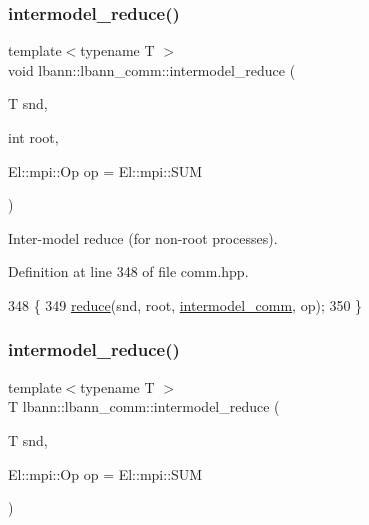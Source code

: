 \subsubsection{\texorpdfstring{intermodel\+\_\+reduce()}{intermodel\_reduce()}\hspace{0.1cm}{\footnotesize\ttfamily [1/2]}}
{\footnotesize\ttfamily template$<$typename T $>$ \\
void lbann\+::lbann\+\_\+comm\+::intermodel\+\_\+reduce (\begin{DoxyParamCaption}\item[{T}]{snd,  }\item[{int}]{root,  }\item[{El\+::mpi\+::\+Op}]{op = {\ttfamily El\+:\+:mpi\+:\+:SUM} }\end{DoxyParamCaption})\hspace{0.3cm}{\ttfamily [inline]}}

Inter-\/model reduce (for non-\/root processes). 

Definition at line 348 of file comm.\+hpp.


\begin{DoxyCode}
348                                                                  \{
349     \hyperlink{classlbann_1_1lbann__comm_ab8a2261394c978aa7e4b74ecebc739a8}{reduce}(snd, root, \hyperlink{classlbann_1_1lbann__comm_a2c51c5d8faf4f0ab4f43b892c55e597b}{intermodel\_comm}, op);
350   \}
\end{DoxyCode}
\mbox{\label{classlbann_1_1lbann__comm_a4861b03da73bbc8fec61a10ebf129ee0}} 
\subsubsection{\texorpdfstring{intermodel\+\_\+reduce()}{intermodel\_reduce()}\hspace{0.1cm}{\footnotesize\ttfamily [2/2]}}
{\footnotesize\ttfamily template$<$typename T $>$ \\
T lbann\+::lbann\+\_\+comm\+::intermodel\+\_\+reduce (\begin{DoxyParamCaption}\item[{T}]{snd,  }\item[{El\+::mpi\+::\+Op}]{op = {\ttfamily El\+:\+:mpi\+:\+:SUM} }\end{DoxyParamCaption})\hspace{0.3cm}{\ttfamily [inline]}}

